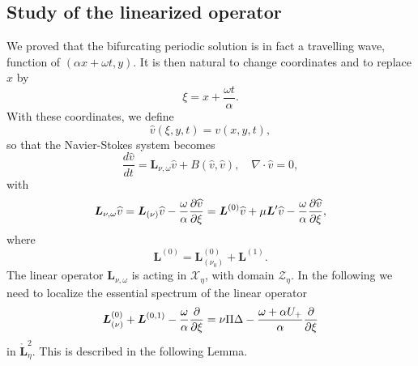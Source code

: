 \documentclass[11pt]{article}
\begin{document}

\subsection{Study of the linearized operator}



We proved that the bifurcating periodic solution is in fact a travelling
wave, function of $(\alpha x+\omega t,y).$ It is then natural to change
coordinates and to replace $x$ by 
\begin{equation*}
\xi =x+\frac{\omega t}{\alpha }.
\end{equation*}%
With these coordinates, we define%
\begin{equation*}
\widehat{v}(\xi ,y,t)=v(x,y,t),
\end{equation*}%
so that the Navier-Stokes system becomes%
\begin{equation}
\frac{d\widehat{v}}{dt}=\boldsymbol{L}_{\nu ,\omega }\widehat{v}+B(\widehat{v%
},\widehat{v}),\quad\nabla \cdot \widehat{v}=0,  \label{new NS equ}
\end{equation}%
with%
\begin{eqnarray*}
\boldsymbol{L}_{\nu ,\omega }\widehat{v} =\boldsymbol{L}_{(\nu )}\widehat{v%
}-\frac{\omega }{\alpha }\frac{\partial \widehat{v}}{\partial \xi } 
=\boldsymbol{L}^{(0)}\widehat{v}+\mu \boldsymbol{L}^{\prime }\widehat{v}-\frac{%
\omega }{\alpha }\frac{\partial \widehat{v}}{\partial \xi },
\end{eqnarray*}%
where%
\begin{equation*}
\boldsymbol{L}^{(0)}=\boldsymbol{L}_{(\nu_0)}^{(0)}+\boldsymbol{L}^{(1)}.
\end{equation*}%
The linear operator $\boldsymbol{L}_{\nu ,\omega }$ is acting in $\mathcal{X}%
_{\eta}$, with domain $\mathcal{Z}_{\eta}.$ In the following we need to localize
the essential spectrum of the linear operator 
$$\boldsymbol{L}_{(\nu )}^{(0)}+\boldsymbol{L}^{(0,1)}-%
\frac{\omega}{\alpha }\frac{\partial }{\partial \xi }=\nu \Pi \Delta -\frac{%
\omega+\alpha U_+ }{\alpha }\frac{\partial }{\partial \xi }$$ in $\boldsymbol{\mathring{L%
}}_{\eta}^{2}.$ This is described in the following Lemma.
\end{document}
